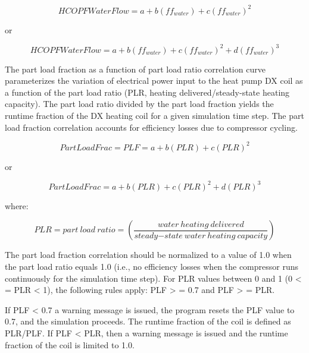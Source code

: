 \begin{equation}
HCOPFWaterFlow = a + b\left( {f{f_{water}}} \right) + c{\left( {f{f_{water}}} \right)^2}
\end{equation}

or

\begin{equation}
HCOPFWaterFlow = a + b\left( {f{f_{water}}} \right) + c{\left( {f{f_{water}}} \right)^2} + d{\left( {f{f_{water}}} \right)^3}
\end{equation}

The part load fraction as a function of part load ratio correlation curve parameterizes the variation of electrical power input to the heat pump DX coil as a function of the part load ratio (PLR, heating delivered/steady-state heating capacity). The part load ratio divided by the part load fraction yields the runtime fraction of the DX heating coil for a given simulation time step. The part load fraction correlation accounts for efficiency losses due to compressor cycling.

\begin{equation}
PartLoadFrac = PLF = a + b\left( {PLR} \right) + c{\left( {PLR} \right)^2}
\end{equation}

or

\begin{equation}
PartLoadFrac = a + b\left( {PLR} \right) + c{\left( {PLR} \right)^2} + d{\left( {PLR} \right)^3}
\end{equation}

where:

\begin{equation}
PLR = part~load~ratio = \left( {\frac{{water~heating~delivered}}{{steady{\mathrm{ - }}state~water~heating~capacity}}} \right)
\end{equation}

The part load fraction correlation should be normalized to a value of 1.0 when the part load ratio equals 1.0 (i.e., no efficiency losses when the compressor runs continuously for the simulation time step). For PLR values between 0 and 1 (0 \textless{} = PLR \textless{} 1), the following rules apply:  PLF \textgreater{} = 0.7 and PLF \textgreater{} = PLR.

If PLF \textless{} 0.7 a warning message is issued, the program resets the PLF value to 0.7, and the simulation proceeds. The runtime fraction of the coil is defined as PLR/PLF. If PLF \textless{} PLR, then a warning message is issued and the runtime fraction of the coil is limited to 1.0.

